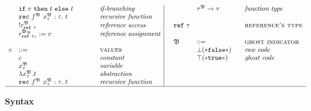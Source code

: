 \begin{figure}[H]
\begin{adjustwidth}{-6em}{-4em}
\begin{displaymath}
\begin{array}{ll@{\hspace*{-0.1cm}}
							 l@{\hspace*{1.5cm} }
							 l|@{\hspace*{0.5cm}}
							 llll}
  & \gif{v}{t}{t}
  & & \textit{if-branching}  &  
  &     \tau^{\mf{B}}  \rightarrow \tau  
  & & \textit{function type} \\  
   		 								      								   
  &	\glrec
  & &  \textit{recursive function}
  & & & & \\
   	   		
   	   								      								   
  &  	\glread
  & &  \textit{reference access} &
  \mathtt{ref}~\tau  &
	& & \textsc{reference's type}  \\      					
 	   
	&  	\gwrite{r}{B}{\tau}{v} 
	& &  \textit{reference assignment} & \\
	
	& & & & \mf{B} & ::= 
  & & \textsc{ghost indicator} \\
	
	{v} & ::= & & \textsc{values} &
	& \bot \mathtt{(* false *)} 
  & & \textit{raw code} \\ 
	
	
	&   c
  & & \textit{constant} & 
  
  & \top \mathtt{(* true *)} 
  & & \textit{ghost code} \\ 



	&		\glvar
	& & \textit{variable} & \\
	

	
  &   \glabst
  & & \textit{abstraction} &	\\
	
	
	
	
	&   \glrec
  & & \textit{recursive function} &	\\
	
 \hline						   
  \end{array} 
\end{displaymath} 
\caption{ \textbf{\gml Syntax} \hfill}
\end{adjustwidth}
\end{figure}
%
%
%

